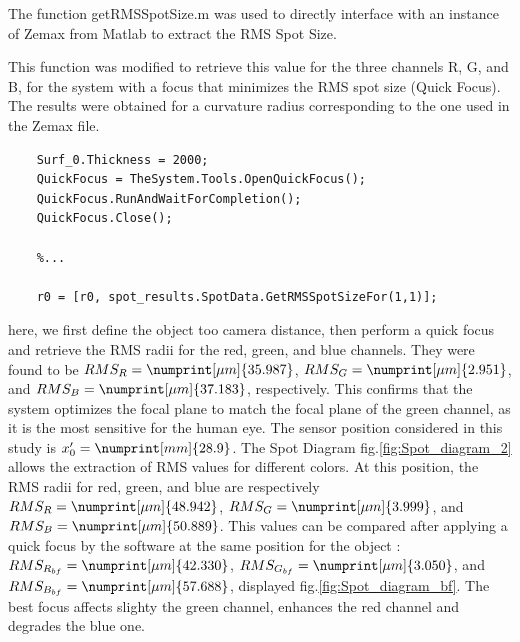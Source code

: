 \documentclass[10pt,letterpaper]{article}
\begin{document}
The function get\textunderscore RMS\textunderscore SpotSize.m was used to directly interface with an instance of Zemax from Matlab to extract the RMS Spot Size. 

This function was modified to retrieve this value for the three channels R, G, and B, for the system with a focus that minimizes the RMS spot size (Quick Focus). The results were obtained for a curvature radius corresponding to the one used in the Zemax file.

\begin{verbatim}
    Surf_0.Thickness = 2000;
    QuickFocus = TheSystem.Tools.OpenQuickFocus();
    QuickFocus.RunAndWaitForCompletion();
    QuickFocus.Close();

    %...

    r0 = [r0, spot_results.SpotData.GetRMSSpotSizeFor(1,1)];
\end{verbatim}

here, we first define the object too camera distance, then perform a quick focus and retrieve the RMS radii for the red, green, and blue channels. They were found to be $RMS_R = \numprint[\mu m]{35.987}$, $RMS_G = \numprint[\mu m]{2.951}$, and $RMS_B = \numprint[\mu m]{37.183}$, respectively. This confirms that the system optimizes the focal plane to match the focal plane of the green channel, as it is the most sensitive for the human eye.
The sensor position considered in this study is $x'_0 = \numprint[mm]{28.9}$. The Spot Diagram fig.\ref{fig:Spot_diagram_2} allows the extraction of RMS values for different colors. At this position, the RMS radii for red, green, and blue are respectively $RMS_R = \numprint[\mu m]{48.942}$, $RMS_G = \numprint[\mu m]{3.999}$, and $RMS_B = \numprint[\mu m]{50.889}$. This values can be compared after applying a quick focus by the software at the same position for the object : $RMS_{R_{bf}} = \numprint[\mu m]{42.330}$, $RMS_{G_{bf}} = \numprint[\mu m]{3.050}$, and $RMS_{B_{bf}} = \numprint[\mu m]{57.688}$, displayed fig.\ref{fig:Spot_diagram_bf}. The best focus affects slighty the green channel, enhances the red channel and degrades the blue one.
\end{document}

